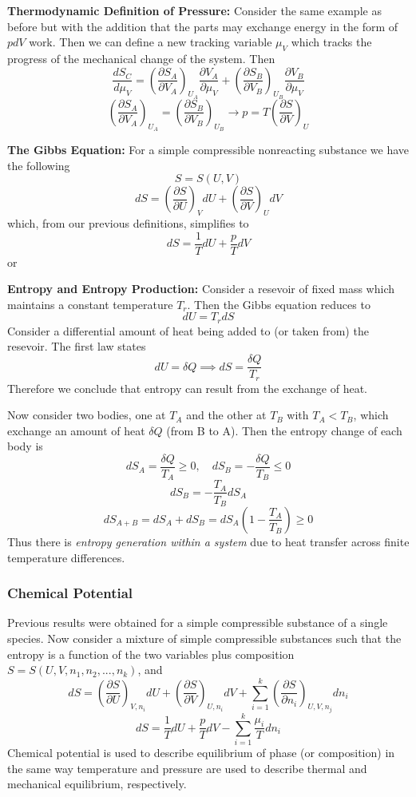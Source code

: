 \documentclass[11pt]{article}
\newcommand{\CenteredBoxed}[1]{\begin{center}\boxed{#1}\end{center}}
\newcommand{\sumlim}[2]{\sum\limits_{#1}^{#2}}
\newcommand{\Partial}[2]{\frac{\partial #1}{\partial #2}}
\newcommand{\PartialConst}[3]{\left(\Partial{#1}{#2}\right)_{#3}}
\begin{document}
\textbf{Thermodynamic Definition of Pressure:}
Consider the same example as before but with the addition that the parts may exchange energy in the form of $pdV$ work.  Then we can define a new tracking variable $\mu_V$ which tracks the progress of the mechanical change of the system. Then
$$\frac{dS_C}{d\mu_V}=\PartialConst{S_A}{V_A}{U_A}\Partial{V_A}{\mu_V} + \PartialConst{S_B}{V_B}{U_B}\Partial{V_B}{\mu_V}$$
$$\PartialConst{S_A}{V_A}{U_A}=\PartialConst{S_B}{V_B}{U_B}\to p = T\PartialConst{S}{V}{U}$$

\textbf{The Gibbs Equation:}
For a simple compressible nonreacting substance we have the following
$$S = S(U,V)$$
$$dS = \PartialConst{S}{U}{V}dU + \PartialConst{S}{V}{U}dV$$
which, from our previous definitions, simplifies to
$$dS = \frac{1}{T}dU + \frac{p}{T}dV$$
or
\CenteredBoxed{dU = TdS - pdV}

\textbf{Entropy and Entropy Production:}
Consider a resevoir of fixed mass which maintains a constant temperature $T_r$. Then the Gibbs equation reduces to
$$dU = T_rdS$$
Consider a differential amount of heat being added to (or taken from) the resevoir. The first law states
$$dU = \delta Q\implies dS = \frac{\delta Q}{T_r}$$
Therefore we conclude that entropy can result from the exchange of heat.

Now consider two bodies, one at $T_A$ and the other at $T_B$ with $T_A<T_B$, which exchange an amount of heat $\delta Q$ (from B to A). Then the entropy change of each body is
$$dS_A =  \frac{\delta Q}{T_A}\geq0,\quad dS_B = - \frac{\delta Q}{T_B}\leq0$$
$$dS_B = -\frac{T_A}{T_B}dS_A$$
$$dS_{A+B} = dS_A + dS_B = dS_A\left(1-\frac{T_A}{T_B}\right)\geq0$$
Thus there is \emph{entropy generation within a system} due to heat transfer across finite temperature differences.

\subsubsection{Chemical Potential}
Previous results were obtained for a simple compressible substance of a single species. Now consider a mixture of simple compressible substances such that the entropy is a function of the two variables plus composition $S = S(U,V,n_1,n_2,...,n_k)$, and
$$dS = \PartialConst{S}{U}{V,n_i}dU + \PartialConst{S}{V}{U,n_i}dV + \sumlim{i=1}{k}\PartialConst{S}{n_i}{U,V,n_j}dn_i$$
$$dS = \frac{1}{T}dU + \frac{p}{T}dV - \sumlim{i=1}{k}\frac{\mu_i}{T}dn_i$$
Chemical potential is used to describe equilibrium of phase (or composition) in the same way temperature and pressure are used to describe thermal and mechanical equilibrium, respectively.
\end{document}
